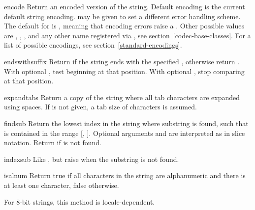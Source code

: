 \begin{methoddesc}[string]{encode}{}
Return an encoded version of the string.  Default encoding is the current
default string encoding.   may be given to set a different
error handling scheme.  The default for  is
, meaning that encoding errors raise a
.  Other possible values are ,
, , 
and any other name registered via ,
see section~\ref{codec-base-classes}.
For a list of possible encodings, see section~\ref{standard-encodings}.
\end{methoddesc}

\begin{methoddesc}[string]{endswith}{suffix}
Return  if the string ends with the specified ,
otherwise return .  With optional , test beginning at
that position.  With optional , stop comparing at that position.
\end{methoddesc}

\begin{methoddesc}[string]{expandtabs}{}
Return a copy of the string where all tab characters are expanded
using spaces.  If  is not given, a tab size of 
characters is assumed.
\end{methoddesc}

\begin{methoddesc}[string]{find}{sub}
Return the lowest index in the string where substring  is
found, such that  is contained in the range [,
].  Optional arguments  and  are
interpreted as in slice notation.  Return  if  is
not found.
\end{methoddesc}

\begin{methoddesc}[string]{index}{sub}
Like , but raise  when the
substring is not found.
\end{methoddesc}

\begin{methoddesc}[string]{isalnum}{}
Return true if all characters in the string are alphanumeric and there
is at least one character, false otherwise.

For 8-bit strings, this method is locale-dependent.
\end{methoddesc}

